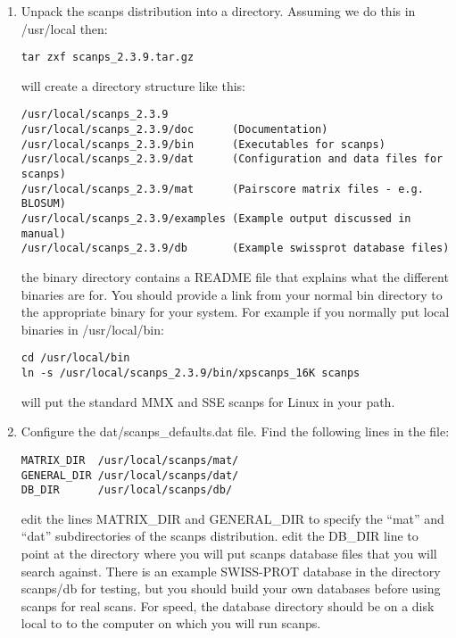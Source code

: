 \documentclass[12pt]{article}
\begin{document}
\begin{enumerate}

\item Unpack the scanps distribution into a directory.  Assuming we do
this in /usr/local then:

\begin{verbatim}
tar zxf scanps_2.3.9.tar.gz
\end{verbatim}

will create a directory structure like this:

\begin{scriptsize}
\begin{verbatim}
/usr/local/scanps_2.3.9
/usr/local/scanps_2.3.9/doc      (Documentation)
/usr/local/scanps_2.3.9/bin      (Executables for scanps)
/usr/local/scanps_2.3.9/dat      (Configuration and data files for scanps)
/usr/local/scanps_2.3.9/mat      (Pairscore matrix files - e.g. BLOSUM)
/usr/local/scanps_2.3.9/examples (Example output discussed in manual)
/usr/local/scanps_2.3.9/db       (Example swissprot database files)
\end{verbatim}
\end{scriptsize}

the binary directory contains a README file that explains what the
different binaries are for.  You should provide a link from your
normal bin directory to the appropriate binary for your system.  For
example if you normally put local binaries in /usr/local/bin:


\begin{verbatim}
cd /usr/local/bin
ln -s /usr/local/scanps_2.3.9/bin/xpscanps_16K scanps
\end{verbatim}

will put the standard MMX and SSE scanps for Linux in your path.

\item Configure the dat/scanps\_defaults.dat file.  Find the following lines in the file:

\begin{scriptsize}
\begin{verbatim}
MATRIX_DIR  /usr/local/scanps/mat/
GENERAL_DIR /usr/local/scanps/dat/
DB_DIR      /usr/local/scanps/db/
\end{verbatim}
\end{scriptsize}

edit the lines MATRIX\_DIR and GENERAL\_DIR to specify the ``mat'' and
``dat'' subdirectories of the scanps distribution.  edit the DB\_DIR
line to point at the directory where you will put scanps database
files that you will search against.  There is an example SWISS-PROT
database in the directory scanps/db for testing, but you should build
your own databases before using scanps for real scans.  For speed, the database
directory should be on a disk local to to the computer on which you
will run scanps.


\end{enumerate}
\end{document}
